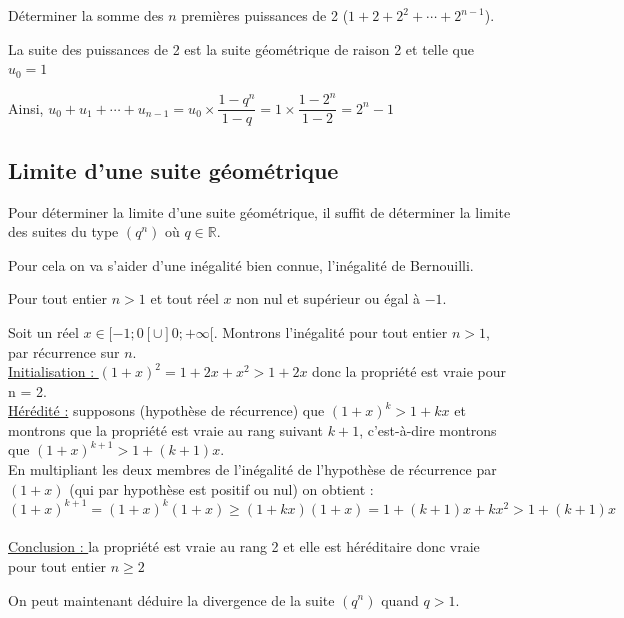 \documentclass[french]{book}
\newcommand{\se}{\geq}
\begin{document}
\begin{exemple}
Déterminer la somme des $n$ premières puissances de 2 ($1+2+2^2+\cdots+2^{n-1}$).


\par La suite des puissances de 2 est la suite géométrique de raison 2 et telle que $u_0=1$
\par Ainsi, $u_{0}+u_{1}+ \cdots+u_{n-1}=u_{0}\times\dfrac{1-q^{n}}{1-q}=1\times\dfrac{1-2^n}{1-2}=2^n-1$

\end{exemple}

\subsection{Limite d'une suite géométrique}
Pour déterminer la limite d'une suite géométrique, il suffit de déterminer la limite des suites du type $(q^n)$ où $q \in \mathbb{R}$.

Pour cela on va s'aider d'une inégalité bien connue, l'inégalité de Bernouilli.

\begin{prop}
Pour tout entier $n > 1$ et tout réel $x$ non nul et supérieur ou égal à $-1$.
\end{prop}

\begin{demo}
Soit un réel $x \in [-1;0[ \cup ]0;+ \infty[ $. Montrons l'inégalité pour tout entier $n > 1$, par récurrence sur $n$.\\

\underline{Initialisation : }
$(1+x)^{2}=1+2x+x^{2}>1+2x$ donc la propriété est vraie pour n = 2.\\

\underline{Hérédité :} supposons (hypothèse de récurrence) que 
$(1+x)^{k}>1+kx$ et montrons que la propriété est vraie au rang suivant $k + 1$, c'est-à-dire montrons que $ (1+x)^{k+1}>1+(k+1)x$.\\

En multipliant les deux membres de l'inégalité de l'hypothèse de récurrence par $(1 + x)$ (qui par hypothèse est positif ou nul) on obtient : 
$$(1+x)^{k+1}=(1+x)^{k}(1+x)\geq (1+kx)(1+x)=1+(k+1)x+kx^{2}>1+(k+1)x$$\\

\underline{Conclusion : } la propriété est vraie au rang 2 et elle est héréditaire donc vraie pour tout entier $n \se 2 $
\end{demo}

On peut maintenant déduire la divergence de la suite $(q^n)$ quand $q>1$.
\end{document}
